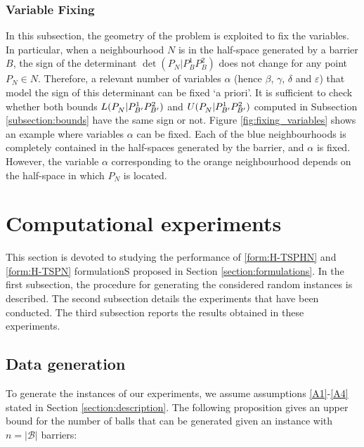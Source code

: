 \documentclass[a4paper,  review, authoryear, 1p.]{elsarticle}
\newcommand{\determinant}[3]{\det({#1|#2#3})}
\begin{document}
	\subsubsection{Variable Fixing}
	In this subsection, the geometry of the problem is exploited to fix the variables. In particular, when a neighbourhood $N$ is in the half-space generated by a barrier $B$, the sign of the determinant $\determinant{P_N}{P_B^1}{P_B^2}$ does not change for any point $P_N\in N$. Therefore, a relevant number of variables $\alpha$ (hence $\beta$, $\gamma$, $\delta$ and $\varepsilon$) that model the sign of this determinant can be fixed `a priori'. It is sufficient to check whether both bounds $L(P_N^{}|P_{B'}^1P_{B'}^2)$ and $U(P_N^{}|P_{B'}^1P_{B'}^2)$ computed in Subsection \ref{subsection:bounds} have the same sign or not. Figure \ref{fig:fixing_variables} shows an example where variables $\alpha$ can be fixed. Each of the blue neighbourhoods is completely contained in the half-spaces generated by the barrier, and $\alpha$ is fixed. However, the variable $\alpha$ corresponding to the orange neighbourhood depends on the half-space in which $P_N$ is located.
	
	
	
	\section{Computational experiments}\label{section:experiments}
	This section is devoted to studying the performance of \eqref{form:H-TSPHN} and \eqref{form:H-TSPN} formulationS proposed in Section \ref{section:formulations}. In the first subsection, the procedure for generating the considered random instances is described. The second subsection details the experiments that have been conducted. The third subsection reports the results obtained in these experiments.
	
	\subsection{Data generation}
	
	To generate the instances of our experiments, we assume  assumptions \ref{A1}-\ref{A4} stated in Section \ref{section:description}. The following proposition gives an upper bound for the number of balls that can be generated given an instance with $n=|\mathcal B|$ barriers:
	
\end{document}
